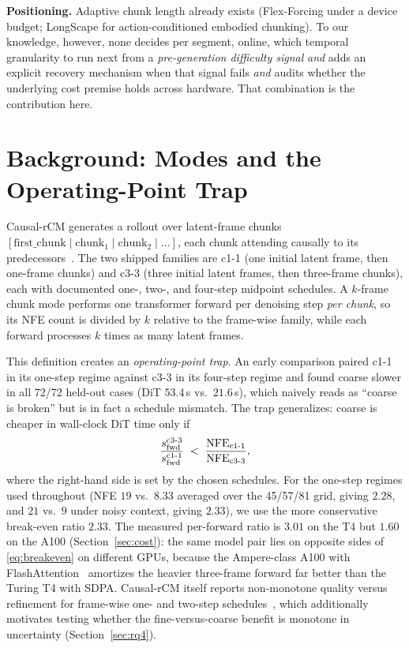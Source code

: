 \documentclass[journal]{IEEEtran}
\newcommand{\cfine}{\textup{c1-1}}
\newcommand{\ccoarse}{\textup{c3-3}}
\begin{document}
\textbf{Positioning.} Adaptive chunk length already exists (Flex-Forcing under a device budget; LongScape for action-conditioned embodied chunking). To our knowledge, however, none decides per segment, online, which temporal granularity to run next from a \emph{pre-generation difficulty signal} \emph{and} adds an explicit recovery mechanism when that signal fails \emph{and} audits whether the underlying cost premise holds across hardware. That combination is the contribution here.

\section{Background: Modes and the Operating-Point Trap}
\label{sec:background}

Causal-rCM generates a rollout over latent-frame chunks $[\text{first\_chunk} \mid \text{chunk}_1 \mid \text{chunk}_2 \mid \dots]$, each chunk attending causally to its predecessors~\cite{zhengCausalrCMUnifiedTeacherForcing2026}. The two shipped families are \cfine{} (one initial latent frame, then one-frame chunks) and \ccoarse{} (three initial latent frames, then three-frame chunks), each with documented one-, two-, and four-step midpoint schedules. A $k$-frame chunk mode performs one transformer forward per denoising step \emph{per chunk}, so its NFE count is divided by $k$ relative to the frame-wise family, while each forward processes $k$ times as many latent frames.

This definition creates an \emph{operating-point trap}. An early comparison paired \cfine{} in its one-step regime against \ccoarse{} in its four-step regime and found coarse slower in all 72/72 held-out cases (DiT $53.4$\,s vs.\ $21.6$\,s), which naively reads as ``coarse is broken'' but is in fact a schedule mismatch. The trap generalizes: coarse is cheaper in wall-clock DiT time only if
\begin{equation}
\frac{s_{\text{fwd}}^{\ccoarse}}{s_{\text{fwd}}^{\cfine}} \;<\; \frac{\mathrm{NFE}_{\cfine}}{\mathrm{NFE}_{\ccoarse}},
\label{eq:breakeven}
\end{equation}
where the right-hand side is set by the chosen schedules. For the one-step regimes used throughout (NFE $19$ vs.\ $8.33$ averaged over the 45/57/81 grid, giving $2.28$, and $21$ vs.\ $9$ under noisy context, giving $2.33$), we use the more conservative break-even ratio $2.33$. The measured per-forward ratio is $3.01$ on the T4 but $1.60$ on the A100 (Section~\ref{sec:cost}): the same model pair lies on opposite sides of \eqref{eq:breakeven} on different GPUs, because the Ampere-class A100 with FlashAttention~\cite{dao2022flashattention} amortizes the heavier three-frame forward far better than the Turing T4 with SDPA. Causal-rCM itself reports non-monotone quality versus refinement for frame-wise one- and two-step schedules~\cite{zhengCausalrCMUnifiedTeacherForcing2026}, which additionally motivates testing whether the fine-versus-coarse benefit is monotone in uncertainty (Section~\ref{sec:rq4}).
\end{document}
